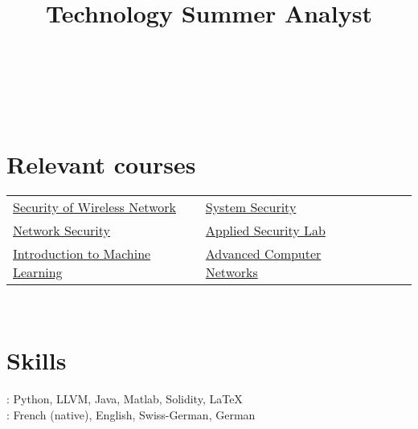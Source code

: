 \documentclass[mm, 11pt]{simple_style}
\begin{document}
\begin{resume}
\begin{position}
{    }
\end{position}\\
\begin{position}
    \title{Technology Summer Analyst}
\end{position}\\
\sectionline
\section{Relevant courses}
    \begin{tabular}{lllll}
        \href{http://www.syssec.ethz.ch/education/sown/sown_AS16.html}{Security of Wireless Network} & \href{http://www.syssec.ethz.ch/education/system_security/system_security_as16.html}{System Security}\\
        \href{https://netsec.ethz.ch/courses/netsec-2016/}{Network Security} & \href{http://www.infsec.ethz.ch/education/as2016.html}{Applied Security Lab} \\
        \href{https://www.cs.cmu.edu/~10601b/}{Introduction to Machine Learning} & \href{https://ndal.ethz.ch/courses/acn.html}{Advanced Computer Networks}\\
    \end{tabular}\\
\sectionline
\section{Skills}
: Python, LLVM, Java, Matlab, Solidity, \LaTeX\\
: French (native), English, Swiss-German, German\\
\sectionline

\end{resume}
\end{document}
